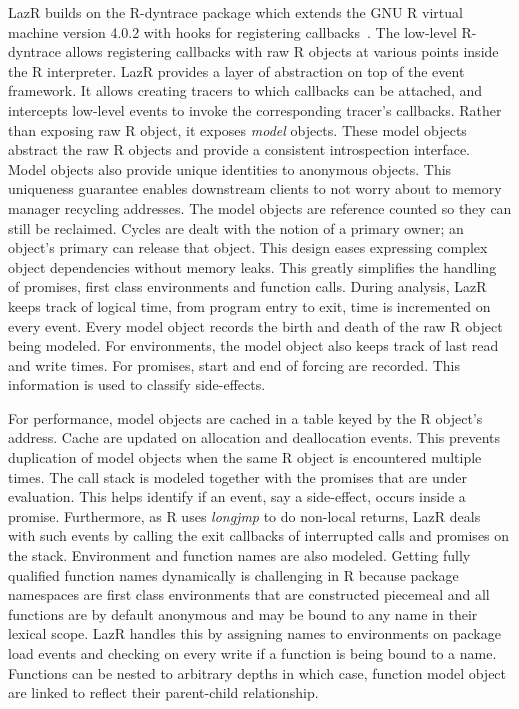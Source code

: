 \documentclass[review,nonacm,screen,acmsmall,anonymous=true]{acmart}
\newcommand{\rdyn}{{\sf R-dyntrace}\xspace}
\newcommand{\lazr}{{\sf LazR}\xspace}
\begin{document}
\lazr builds on the \rdyn package which extends the GNU R
virtual machine version 4.0.2 with hooks for registering
callbacks~\cite{oopsla19b}.
The low-level \rdyn allows registering callbacks with raw R objects at various
points inside the R interpreter.
\lazr provides a layer of abstraction on top of the event framework. It allows
creating tracers to which callbacks can be attached, and intercepts low-level
events to invoke the corresponding tracer's callbacks. Rather than exposing raw
R object, it exposes \emph{model} objects. These model objects abstract the raw
R objects and provide a consistent introspection interface. Model objects also
provide unique identities to anonymous objects. This uniqueness guarantee
enables downstream clients to not worry about to memory manager recycling
addresses. The model objects are reference counted so they can still be
reclaimed. Cycles are dealt with the notion of a primary owner; an object's
primary can release that object. This design eases expressing complex object
dependencies without memory leaks. This greatly simplifies the handling of
promises, first class environments and function calls.
During analysis, \lazr keeps track of logical time, from program entry to exit,
time is incremented on every event. Every model object records the birth and
death of the raw R object being modeled. For environments, the model object also
keeps track of last read and write times. For promises, start and end of forcing
are recorded. This information is used to classify side-effects.

For performance, model objects are cached in a table keyed by the R object's
address. Cache are updated on allocation and deallocation events. This prevents
duplication of model objects when the same R object is encountered multiple
times. The call stack is modeled together with the promises that are under
evaluation. This helps identify if an event, say a side-effect, occurs inside a
promise. Furthermore, as R uses \emph{longjmp} to do non-local returns, \lazr
deals with such events by calling the exit callbacks of interrupted calls and
promises on the stack. Environment and function names are also modeled. Getting
fully qualified function names dynamically is challenging in R because package
namespaces are first class environments that are constructed piecemeal and all
functions are by default anonymous and may be bound to any name in their lexical
scope. \lazr handles this by assigning names to environments on package load
events and checking on every write if a function is being bound to a name.
Functions can be nested to arbitrary depths in which case, function model object
are linked to reflect their parent-child relationship.
\end{document}
